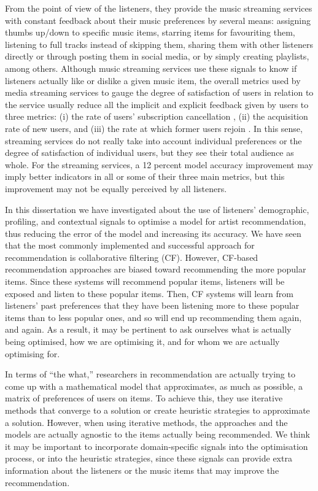From the point of view of the listeners, they provide the music streaming services with constant feedback about their music preferences by several means: assigning thumbs up/down to specific music items, starring items for favouriting them, listening to full tracks instead of skipping them, sharing them with other listeners directly or through posting them in social media, or by simply creating playlists, among others. 
Although music streaming services use these signals to know if listeners actually like or dislike a given music item, the overall metrics used by media streaming services to gauge the degree of satisfaction of users in relation to the service usually reduce all the implicit and explicit feedback given by users to three metrics: (i) the rate of users' subscription cancellation , (ii) the acquisition rate of new users, and (iii) the rate at which former users rejoin \autocite{gomez15netflix}.
In this sense, streaming services do not really take into account individual preferences or the degree of satisfaction of individual users, but they see their total audience as whole. 
For the streaming services, a 12 percent model accuracy improvement may imply better indicators in all or some of their three main metrics, but this improvement may not be equally perceived by all listeners.


In this dissertation we have investigated about the use of listeners' demographic, profiling, and contextual signals to optimise a model for artist recommendation, thus reducing the error of the model and increasing its accuracy.
We have seen that the most commonly implemented and successful approach for recommendation is collaborative filtering (CF). 
However, CF-based recommendation approaches are biased toward recommending the more popular items. 
Since these systems will recommend popular items, listeners will be exposed and listen to these popular items. Then, CF systems will learn from listeners' past preferences that they have been listening more to these popular items than to less popular ones, and so will end up recommending them again, and again. 
As a result, it may be pertinent to ask ourselves what is actually being optimised, how we are optimising it, and for whom we are actually optimising for.

In terms of ``the what,'' researchers in recommendation are actually trying to come up with a mathematical model that approximates, as much as possible, a matrix of preferences of users on items. To achieve this, they use iterative methods that converge to a solution or create heuristic strategies to approximate a solution. 
However, when using iterative methods, the approaches and the models are actually agnostic to the items actually being recommended. 
We think it may be important to incorporate domain-specific signals into the optimisation process, or into the heuristic strategies, since these signals can provide extra information about the listeners or the music items that may improve the recommendation. 

